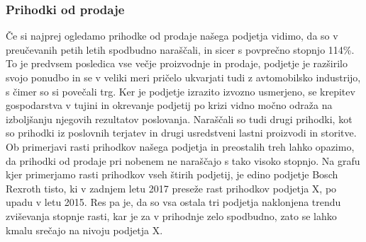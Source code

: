 \documentclass[12pt,a4paper]{amsart}
\theoremstyle{definition} %
\theoremstyle{plain} %
\begin{document}
\subsubsection{Prihodki od prodaje}
Če si najprej ogledamo prihodke od prodaje našega podjetja vidimo, da so v preučevanih petih letih spodbudno naraščali, in sicer s povprečno stopnjo 114\%. To je predvsem posledica vse večje proizvodnje in prodaje, podjetje je razširilo svojo ponudbo in se v veliki meri pričelo ukvarjati tudi z avtomobilsko industrijo, s čimer so si povečali trg. Ker je podjetje izrazito izvozno usmerjeno, se krepitev gospodarstva v tujini in okrevanje podjetij po krizi vidno močno odraža na izboljšanju njegovih rezultatov poslovanja. Naraščali so tudi drugi prihodki, kot so prihodki iz poslovnih terjatev in drugi usredstveni lastni proizvodi in storitve. Ob primerjavi rasti prihodkov našega podjetja in preostalih treh lahko opazimo, da prihodki od prodaje pri nobenem ne naraščajo s tako visoko stopnjo. 
Na grafu kjer primerjamo rasti prihodkov vseh štirih podjetij, je edino podjetje Bosch Rexroth tisto, ki v zadnjem letu 2017 preseže rast prihodkov podjetja X, po upadu v letu 2015. Res pa je, da so vsa ostala tri podjetja naklonjena trendu zviševanja stopnje rasti, kar je za v prihodnje zelo spodbudno, zato se lahko kmalu srečajo na nivoju podjetja X.
\end{document}
